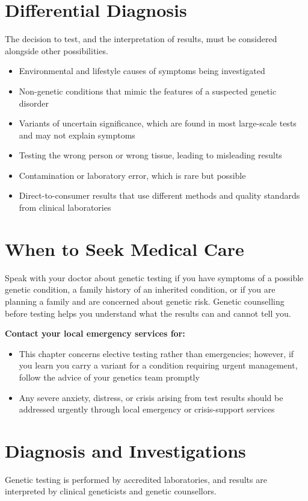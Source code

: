 \section*{Differential Diagnosis}
The decision to test, and the interpretation of results, must be considered alongside other possibilities.

\begin{itemize}
    \item Environmental and lifestyle causes of symptoms being investigated
    \item Non-genetic conditions that mimic the features of a suspected genetic disorder
    \item Variants of uncertain significance, which are found in most large-scale tests and may not explain symptoms
    \item Testing the wrong person or wrong tissue, leading to misleading results
    \item Contamination or laboratory error, which is rare but possible
    \item Direct-to-consumer results that use different methods and quality standards from clinical laboratories
\end{itemize}

\section*{When to Seek Medical Care}
Speak with your doctor about genetic testing if you have symptoms of a possible genetic condition, a family history of an inherited condition, or if you are planning a family and are concerned about genetic risk. Genetic counselling before testing helps you understand what the results can and cannot tell you.

\textbf{Contact your local emergency services for:}
\begin{itemize}
    \item This chapter concerns elective testing rather than emergencies; however, if you learn you carry a variant for a condition requiring urgent management, follow the advice of your genetics team promptly
    \item Any severe anxiety, distress, or crisis arising from test results should be addressed urgently through local emergency or crisis-support services
\end{itemize}

\section*{Diagnosis and Investigations}
Genetic testing is performed by accredited laboratories, and results are interpreted by clinical geneticists and genetic counsellors.


